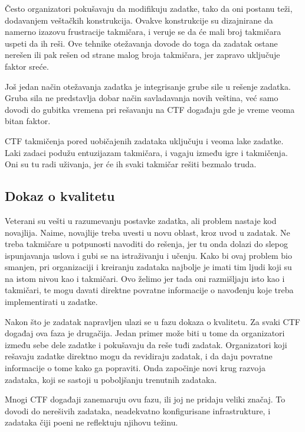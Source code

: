 \documentclass[12pt, a4paper, twocolumn]{article}
\begin{document}
Često organizatori pokušavaju da modifikuju zadatke, tako da oni postanu teži,
dodavanjem veštačkih konstrukcija. Ovakve konstrukcije su dizajnirane da 
namerno izazovu frustracije takmičara, i veruje se da će mali broj takmičara 
uspeti da ih reši. Ove tehnike otežavanja dovode do toga da zadatak ostane 
nerešen ili pak rešen od strane malog broja takmičara, jer zapravo uključuje 
faktor sreće. 

Još jedan način otežavanja zadatka je integrisanje grube sile u rešenje
zadatka. Gruba sila ne predstavlja dobar način savladavanja novih veština,
već samo dovodi do gubitka vremena pri rešavanju na CTF događaju gde je 
vreme veoma bitan faktor.

CTF takmičenja pored uobičajenih zadataka uključuju i veoma lake zadatke.
Laki zadaci podužu entuzijazam takmičara, i vagaju između igre i takmičenja. 
Oni su tu radi uživanja, jer će ih svaki takmičar rešiti bezmalo truda.

\subsection{Dokaz o kvalitetu}

Veterani su vešti u razumevanju postavke zadatka, ali problem nastaje kod 
novajlija. Naime, novajlije treba uvesti u novu oblast, kroz uvod u zadatak. 
Ne treba takmičare u potpunosti navoditi do rešenja, jer tu onda dolazi do 
slepog ispunjavanja uslova i gubi se na istraživanju i učenju. Kako bi ovaj 
problem bio smanjen, pri organizaciji i kreiranju zadataka najbolje je imati 
tim ljudi koji su na istom nivou kao i takmičari. Ovo želimo jer tada oni 
razmišljaju isto kao i takmičari, te mogu davati direktne povratne informacije 
o navođenju koje treba implementirati u zadatke. 

Nakon što je zadatak napravljen ulazi se u fazu dokaza o kvalitetu. Za
svaki CTF događaj ova faza je drugačija. Jedan primer može biti u tome
da organizatori između sebe dele zadatke i pokušavaju da reše tuđi zadatak.
Organizatori koji rešavaju zadatke direktno mogu da revidiraju zadatak, i
da daju povratne informacije o tome kako ga popraviti. Onda započinje novi
krug razvoja zadataka, koji se sastoji u poboljšanju trenutnih zadataka.

Mnogi CTF događaji zanemaruju ovu fazu, ili joj ne pridaju veliki značaj.
To dovodi do nerešivih zadataka, neadekvatno konfigurisane infrastrukture,
i zadataka čiji poeni ne reflektuju njihovu težinu.
\end{document}
